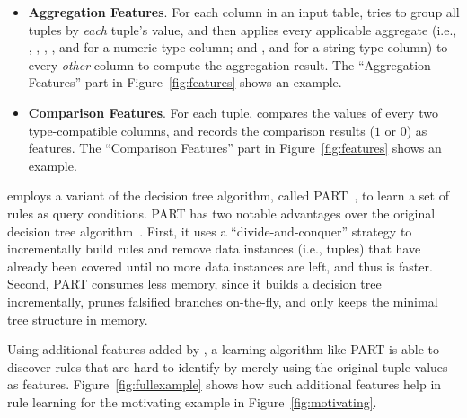 \begin{itemize}

\item {\textbf{Aggregation Features}}. For each
column in an input table, \ourtool tries
to group all tuples by \textit{each} tuple's
value, and then applies every applicable aggregate (i.e.,
, , ,
, and  for a numeric type column;
and , and  for
a string type column) to every
 \textit{other} column to compute the aggregation result. 
The ``Aggregation Features'' part in Figure~\ref{fig:features}
shows an example.

\item {\textbf{Comparison Features}}. For each tuple,
\ourtool compares
the values of every two type-compatible columns, and records
the comparison results ($1$ or $0$) as features.
The ``Comparison Features'' part in Figure~\ref{fig:features}
shows an example.

\end{itemize}



\ourtool employs a variant of the decision tree algorithm,
called PART~\cite{Frank:1998}, to learn a set of rules
as query conditions.
PART has two notable advantages over the
original decision tree algorithm~\cite{Quinlan:1986}.
First, it uses a ``divide-and-conquer'' strategy to incrementally
build rules and remove data instances (i.e., tuples) that have already been covered until
no more data instances are left, and thus is faster.
Second, PART consumes less memory, since it builds a decision
tree incrementally, prunes falsified branches on-the-fly,
and only keeps the minimal tree structure in memory.

Using additional features added by \ourtool, a learning
algorithm like PART is able to discover rules that are
hard to identify by merely using the original tuple values as features.
Figure~\ref{fig:fullexample} shows how such additional features
help in rule learning for the motivating
example in Figure~\ref{fig:motivating}.




